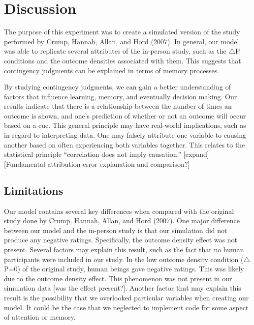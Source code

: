 \documentclass[
  english,
  man,floatsintext]{apa6}
\begin{document}
\hypertarget{discussion}{%
\section{Discussion}\label{discussion}}

The purpose of this experiment was to create a simulated version of the study performed by Crump, Hannah, Allan, and Hord (2007). In general, our model was able to replicate several attributes of the in-person study, such as the \(\triangle\)P conditions and the outcome densities associated with them. This suggests that contingency judgments can be explained in terms of memory processes.

By studying contingency judgments, we can gain a better understanding of factors that influence learning, memory, and eventually decision making. Our results indicate that there is a relationship between the number of times an outcome is shown, and one's prediction of whether or not an outcome will occur based on a cue. This general principle may have real-world implications, such as in regard to interpreting data. One may falsely attribute one variable to causing another based on often experiencing both variables together. This relates to the statistical principle ``correlation does not imply causation.'' {[}expand{]}
{[}Fundamental attribution error explanation and comparison?{]}

\hypertarget{limitations}{%
\subsection{Limitations}\label{limitations}}

Our model contains several key differences when compared with the original study done by Crump, Hannah, Allan, and Hord (2007). One major difference between our model and the in-person study is that our simulation did not produce any negative ratings. Specifically, the outcome density effect was not present. Several factors may explain this result, such as the fact that no human participants were included in our study. In the low outcome density condition (\(\triangle\)P=0) of the original study, human beings gave negative ratings. This was likely due to the outcome density effect. This phenomenon was not present in our simulation data {[}was the effect present?{]}. Another factor that may explain this result is the possibility that we overlooked particular variables when creating our model. It could be the case that we neglected to implement code for some aspect of attention or memory.
\end{document}
